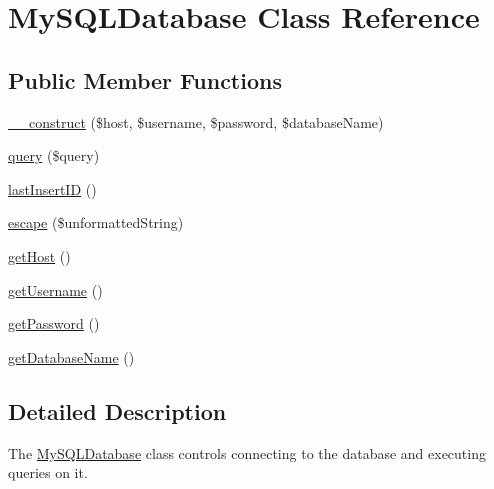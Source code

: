 \hypertarget{classMySQLDatabase}{\section{My\-S\-Q\-L\-Database Class Reference}
\label{classMySQLDatabase}
}
\subsection*{Public Member Functions}
\begin{DoxyCompactItemize}
\item 
\hyperlink{classMySQLDatabase_a2d88228d5495297835baad61c42c46e9}{\-\_\-\-\_\-construct} (\$host, \$username, \$password, \$database\-Name)
\item 
\hyperlink{classMySQLDatabase_a18589a16cc77b98eb42d04062d644525}{query} (\$query)
\item 
\hyperlink{classMySQLDatabase_ae3e08d527970ad668341774f00bae29d}{last\-Insert\-I\-D} ()
\item 
\hyperlink{classMySQLDatabase_a5cea1bd5e88ba4639c1f8d156d308b8b}{escape} (\$unformatted\-String)
\item 
\hyperlink{classMySQLDatabase_a2d5696203843406d814c0d143f13e5d8}{get\-Host} ()
\item 
\hyperlink{classMySQLDatabase_aa0074fc1de94affc807bd980450fab1f}{get\-Username} ()
\item 
\hyperlink{classMySQLDatabase_ab10a61ee32f4466ca56dedda14f22a98}{get\-Password} ()
\item 
\hyperlink{classMySQLDatabase_a557b32616d378fbd8f8b321120bd995f}{get\-Database\-Name} ()
\end{DoxyCompactItemize}


\subsection{Detailed Description}
The \hyperlink{classMySQLDatabase}{My\-S\-Q\-L\-Database} class controls connecting to the database and executing queries on it. 

